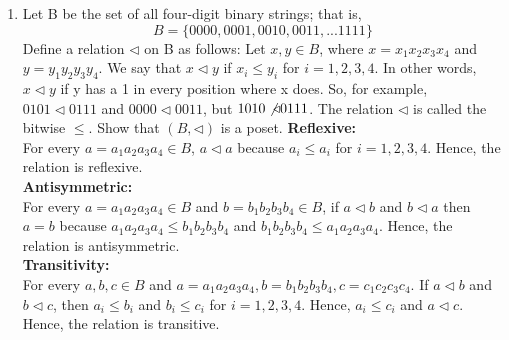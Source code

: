 \documentclass[12pt]{article}
\begin{document}
\begin{enumerate}
\begin{center}
    \end{center}
  \newpage
  \setcounter{enumi}{21}
  \item Let B be the set of all four-digit binary strings; that is,
  \[B = \{0000,0001,0010,0011,...1111\}\]
  Define a relation $\triangleleft$ on B as follows: Let $x, y \in B$, where $x = x_1x_2x_3x_4$ and $y = y_1y_2y_3y_4$. We say that $x \triangleleft y$ if $x_i \leq y_i$ for $i = 1, 2, 3, 4$. In other words, $x \triangleleft y$ if y has a 1 in every position where x does. So, for example, $0101 \triangleleft 0111$ and $0000 \triangleleft 0011$, but $1010 \not\triangleleft 0111$. The relation $\triangleleft$ is called the bitwise $\leq$. Show that $(B, \triangleleft)$ is a poset.
  \textbf{Reflexive: }\\
  For every $a = a_1a_2a_3a_4 \in B$, $a \triangleleft a$ because $a_i \leq a_i$ for $i = 1,2,3,4$. Hence, the relation is reflexive.\\
  \textbf{Antisymmetric: }\\
  For every $a = a_1a_2a_3a_4 \in B$ and $b = b_1b_2b_3b_4 \in B$, if $a \triangleleft b$ and $b \triangleleft a$ then $a = b$ because $a_1a_2a_3a_4 \leq b_1b_2b_3b_4$ and $b_1b_2b_3b_4 \leq a_1a_2a_3a_4$. Hence, the relation is antisymmetric. \\
  \textbf{Transitivity: }\\
  For every $a,b,c \in B$ and $a = a_1a_2a_3a_4, b=b_1b_2b_3b_4, c = c_1c_2c_3c_4$. If $a \triangleleft b$ and $b \triangleleft c$, then $a_i \leq b_i$ and $b_i \leq c_i$ for $i = 1,2,3,4$. Hence, $a_i \leq c_i$ and $a \triangleleft c$. Hence, the relation is transitive.\\

\end{enumerate}
\end{document}
